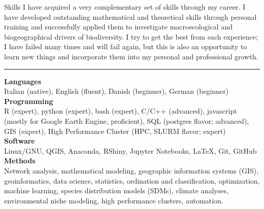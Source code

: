 \documentclass{resume} %
\newcommand{\spazio}{\begin{center} \par\noindent\rule{0.2\textwidth}{0.4pt} \end{center}}
\begin{document}
\begin{rSection}{Skills}
I have acquired a very complementary set of skills through my career.
I have developed outstanding mathematical and theoretical skills through personal training and successfully applied them to investigate macroecological and biogeographical drivers of biodiversity.
I try to get the best from each experience; I have failed many times and will fail again, but this is also an opportunity to learn new things and incorporate them into my personal and professional growth.

\spazio

{\bf Languages}\\
Italian (native), English (fluent), Danish (beginner), German (beginner)\\
{\bf Programming}\\
R (expert), python (expert), bash (expert), C/C++ (advanced), javascript (mostly for Google Earth Engine, proficient), SQL (postgres flavor; advanced), GIS (expert), High Performance Cluster (HPC, SLURM flavor; expert)\\
{\bf Software} \\
Linux/GNU, QGIS, Anaconda, RShiny, Jupyter Notebooks, \LaTeX, Git, GitHub\\
{\bf Methods} \\
Network analysis,
mathematical modeling,
geographic information systems (GIS),
geoinformatics,
data science,
statistics,
ordination and classification,
optimization,
machine learning,
species distribution models (SDMs),
climate analyses,
environmental niche modeling,
high performance clusters, 
automation.
\end{rSection}
\end{document}
